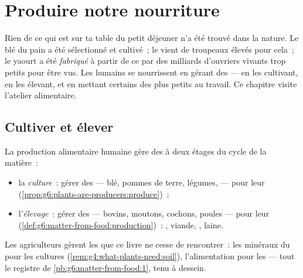 \chapter{Produire notre nourriture}\label{ch:g6:producing-our-food}

Rien de ce qui est sur ta table du petit déjeuner n'a été trouvé
dans la nature. Le blé du pain a été sélectionné et cultivé~; le
 vient de troupeaux élevés pour cela~; le yaourt a été
\emph{fabriqué} à partir de ce  par des milliards d'ouvriers
vivants trop petits pour être vus. Les humains se nourrissent en
gérant des  --- en les cultivant, en les élevant, et en
mettant certains des plus petits au travail. Ce chapitre visite
l'atelier alimentaire.

\section{Cultiver et élever}

\begin{definition}\label{def:g6:producing-our-food:farming}
La production alimentaire humaine gère des  à deux
étages du cycle de la matière~:
\begin{itemize}
  \item la \emph{culture}~: gérer des 
        --- blé, pommes de terre, légumes,  --- pour leur
        (\cref{prop:g6:plants-are-producers:produce})~;
  \item l'\emph{élevage}~: gérer des 
        --- bovins, moutons, cochons, poules --- pour leur
        (\cref{def:g6:matter-from-food:production})~: , viande,
        , laine.
\end{itemize}
Les agriculteurs gèrent les  que ce livre ne cesse de
rencontrer~: les minéraux du  pour les cultures
(\cref{rem:g4:what-plants-need:soil}), l'alimentation pour les
 --- tout le registre de
\cref{pb:g6:matter-from-food:1}, tenu à dessein.
\end{definition}

